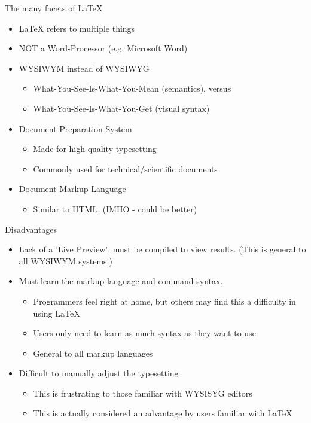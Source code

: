 \documentclass{beamer}
\begin{document}
\begin{frame}{The many facets of \LaTeX}
  \begin{itemize}
  \item {\LaTeX} refers to multiple things
  \item
    NOT a Word-Processor (e.g. Microsoft Word)
  \item
    WYSIWYM instead of WYSIWYG
  \begin{itemize}
    \item
      What-You-See-Is-What-You-Mean (semantics), versus
    \item
      What-You-See-Is-What-You-Get  (visual syntax)
  \end{itemize}
  \item
    Document Preparation System
  \begin{itemize}
    \item
      Made for high-quality typesetting
    \item
      Commonly used for technical/scientific documents
  \end{itemize}
  \item
    Document Markup Language
  \begin{itemize}
    \item
      Similar to HTML. (IMHO - could be better)
  \end{itemize}
  \end{itemize}
\end{frame}

\begin{frame}{Disadvantages}
  \begin{itemize}
  \item
    Lack of a 'Live Preview', must be compiled to view results.
    (This is general to all WYSIWYM systems.)
  \item
    Must learn the markup language and command syntax.
  \begin{itemize}
    \item
      Programmers feel right at home, but others may find this a
       difficulty in using \LaTeX
    \item
      Users only need to learn as much syntax as they want to use
    \item
      General to all markup languages
  \end{itemize}
  \item
    Difficult to manually adjust the typesetting
  \begin{itemize}
  \item
    This is frustrating to those familiar with WYSISYG editors
  \item
    This is actually considered an advantage by users familiar with
    \LaTeX
  \end{itemize}
  \end{itemize}
\end{frame}
\end{document}
